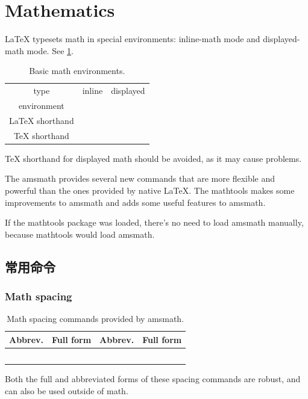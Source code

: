 \documentclass[a4paper,oneside]{book}
\newcommand{\package}[1]{\textsf{#1}}
\newcommand{\syntax}[1]{\PVerb{#1}}
\newcommand{\command}[1]{\PVerb{#1}}
\begin{document}
\part{Mathematics}
\LaTeX{} typesets math in special environments: inline-math mode and displayed-math mode. See \cref{tab:basicMathEnvironments}.
\begin{table}[!htbp]
  \centering
  \begin{tabular}{ccc}
    \hline
    type&inline&displayed\\
    environment&\syntax{math}&\syntax{displaymath}\\
    \LaTeX{} shorthand&\syntax{\(...\)}&\syntax{\[...\]}\\
    \TeX{} shorthand&\syntax{$...$}&\syntax{$$...$$}\\
    \hline
  \end{tabular}
  \caption{Basic math environments.}
  \label{tab:basicMathEnvironments}
\end{table}
\TeX{} shorthand \syntax{$$...$$} for displayed math should be avoided, as it may cause problems.

The \package{amsmath} provides several new commands that are more flexible and powerful than the ones provided by native \LaTeX{}. The \package{mathtools} makes some improvements to \package{amsmath} and adds some useful features to \package{amsmath}.

If the \package{mathtools} package was loaded, there's no need to load \package{amsmath} manually, because \package{mathtools} would load \package{amsmath}.

\chapter{常用命令}
\section{Math spacing}

\begin{table}[htpb]
\centering
\begin{tabular}{ll|ll}
Abbrev.&Full form&Abbrev.&Full form\\
\hline
\syntax{\,}&\command{\thinspace}&\command{\!}&\negthinspace\\
\command{\:}&\command{\medspace}&&\command{\negmedspace}\\
\command{\;}&\command{\thickspace}&&\command{\negthickspace}\\
&\command{\quad}&&\\
&\command{\qquad}&&
\end{tabular}
\caption{Math spacing commands provided by \package{amsmath}.}
\end{table}
Both the full and abbreviated forms of these spacing commands are robust, and can also be used outside of math.
\end{document}
